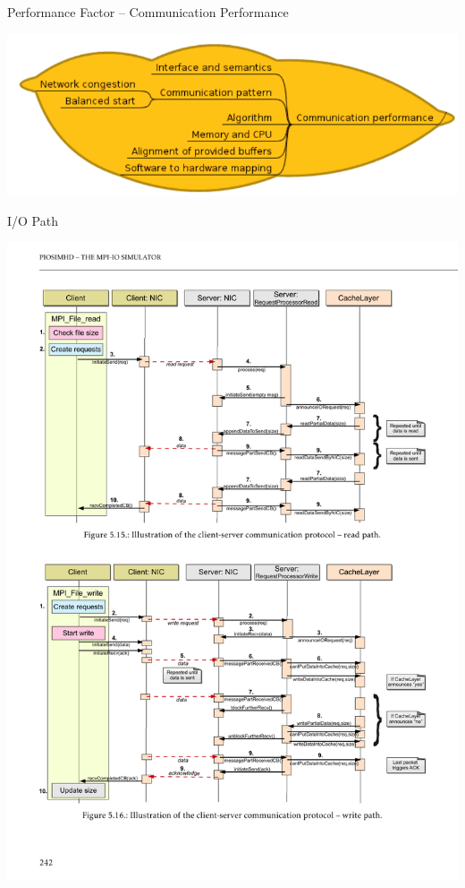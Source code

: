 \documentclass[compress,11pt,xcolor=svgnames,aspectratio=169]{beamer}
\begin{document}
\begin{frame}[t]{Performance Factor -- Communication Performance}

\begin{center}
\includegraphics[scale=0.4]{fig/tree-comm-perf}
\end{center}

\nocite{SOPPOAASLK13}

\end{frame}

\begin{frame}[t]{I/O Path}

\begin{center}
\includegraphics[scale=0.5]{fig/io-path}
\end{center}

\nocite{SOPPOAASLK13}

\end{frame}
\end{document}
